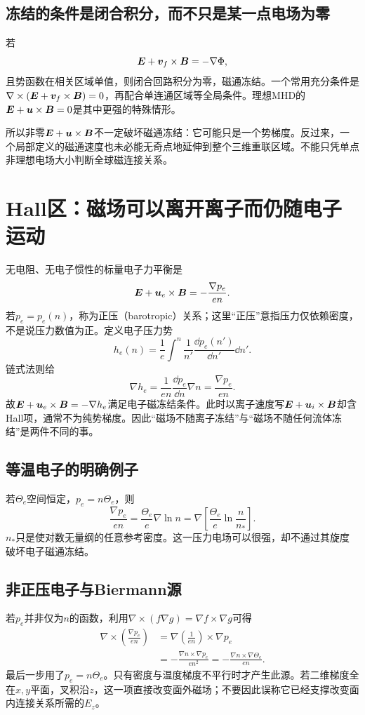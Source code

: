 \subsection{冻结的条件是闭合积分，而不只是某一点电场为零}
若
\begin{equation}
\bm{E}+\bm{v}_f\times\bm{B}=-\nabla\Phi,
\end{equation}
且势函数在相关区域单值，则闭合回路积分为零，磁通冻结。一个常用充分条件是$\nabla\times(\bm{E}+\bm{v}_f\times\bm{B})=0$，再配合单连通区域等全局条件。理想MHD的$\bm{E}+\bm{u}\times\bm{B}=0$是其中更强的特殊情形。

所以非零$\bm{E}+\bm{u}\times\bm{B}$不一定破坏磁通冻结：它可能只是一个势梯度。反过来，一个局部定义的磁通速度也未必能无奇点地延伸到整个三维重联区域。不能只凭单点非理想电场大小判断全球磁连接关系。

\section{Hall区：磁场可以离开离子而仍随电子运动}
无电阻、无电子惯性的标量电子力平衡是
\begin{equation}
\bm{E}+\bm{u}_e\times\bm{B}=-\frac{\nabla p_e}{en}.
\end{equation}
若$p_e=p_e(n)$，称为正压（barotropic）关系；这里“正压”意指压力仅依赖密度，不是说压力数值为正。定义电子压力势
\begin{equation}
h_e(n)=\frac1e\int^n\frac1{n'}\frac{\dd p_e(n')}{\dd n'}\dd n'.
\end{equation}
链式法则给
\begin{equation}
\nabla h_e=\frac1{en}\frac{\dd p_e}{\dd n}\nabla n
=\frac{\nabla p_e}{en}.
\end{equation}
故$\bm{E}+\bm{u}_e\times\bm{B}=-\nabla h_e$满足电子磁冻结条件。此时以离子速度写$\bm{E}+\bm{u}_i\times\bm{B}$却含Hall项，通常不为纯势梯度。因此“磁场不随离子冻结”与“磁场不随任何流体冻结”是两件不同的事。

\subsection{等温电子的明确例子}
若$\Theta_e$空间恒定，$p_e=n\Theta_e$，则
\begin{equation}
\frac{\nabla p_e}{en}=
\frac{\Theta_e}{e}\nabla\ln n
=\nabla\left[\frac{\Theta_e}{e}\ln\frac n{n_*}\right].
\end{equation}
$n_*$只是使对数无量纲的任意参考密度。这一压力电场可以很强，却不通过其旋度破坏电子磁通冻结。

\subsection{非正压电子与Biermann源}
若$p_e$并非仅为$n$的函数，利用$\nabla\times(f\nabla g)=\nabla f\times\nabla g$可得
\begin{align}
\nabla\times\left(\frac{\nabla p_e}{en}\right)
&=\nabla\left(\frac1{en}\right)\times\nabla p_e\\
&=-\frac{\nabla n\times\nabla p_e}{en^2}
=-\frac{\nabla n\times\nabla\Theta_e}{en}.
\label{hall:eq:biermann}
\end{align}
最后一步用了$p_e=n\Theta_e$。只有密度与温度梯度不平行时才产生此源。若二维梯度全在$x,y$平面，叉积沿$z$，这一项直接改变面外磁场；不要因此误称它已经支撑改变面内连接关系所需的$E_z$。


